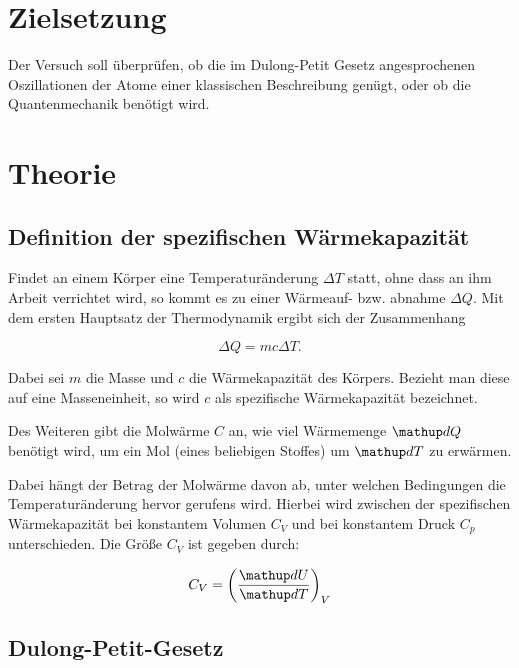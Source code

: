 \section*{Zielsetzung}
Der Versuch soll überprüfen, ob die im Dulong-Petit Gesetz %
angesprochenen Oszillationen der Atome einer klassischen Beschreibung genügt, %
oder ob die Quantenmechanik benötigt wird. %


\section{Theorie}

\subsection{Definition der spezifischen Wärmekapazität}

Findet an einem Körper eine Temperaturänderung $\Delta T$ statt, ohne dass an ihm  %
Arbeit verrichtet wird, so kommt es zu einer Wärmeauf- bzw. abnahme $\Delta Q$. %
Mit dem ersten Hauptsatz der Thermodynamik ergibt sich der Zusammenhang %

\begin{equation*}
\Delta Q=m c \Delta T.
\end{equation*}

Dabei sei $m$ die Masse und $c$ die Wärmekapazität
des Körpers.
Bezieht man diese auf eine Masseneinheit, 
so wird $c$ als spezifische Wärmekapazität bezeichnet.

Des Weiteren gibt die Molwärme $C$
an, wie viel Wärmemenge $\map{d}Q$ benötigt wird, %
um ein Mol (eines beliebigen Stoffes) um $\map{d}T$ zu erwärmen.

Dabei hängt der Betrag der Molwärme davon ab, unter welchen Bedingungen
die Temperaturänderung hervor gerufens wird.
Hierbei wird zwischen der spezifischen Wärmekapazität bei konstantem
Volumen $C_{V}$ und bei konstantem Druck $C_{p}$ unterschieden.
Die Größe $C_{V}$ ist gegeben durch: %

\begin{equation}
\label{eq:molwarme}
C_V=\left(\frac{\map{d}U}{\map{d}T}\right)_V
\end{equation}


\subsection{Dulong-Petit-Gesetz}


